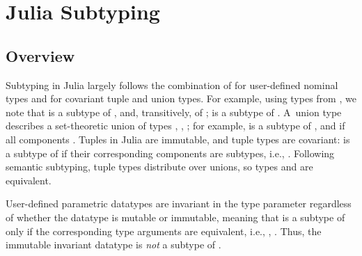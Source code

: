 \chapter{Julia Subtyping}%
\label{chap:julia-sub}


\section{Overview}\label{sec:julia-sub:overview}

Subtyping in Julia largely follows the combination of
 for user-defined nominal types and
 for covariant tuple and union types.
For example, using types from , we note that
 is a subtype of , and, transitively, of ;
 is a subtype of .
A~union type  describes a set-theoretic union of
types , , ; for example,  is a subtype of
, and  if all
components .
Tuples in Julia are immutable, and tuple types are covariant:
 is a subtype of  if
their corresponding components are subtypes, i.e., .
Following semantic subtyping, tuple types distribute over unions,
so types  and
 are equivalent.

User-defined parametric datatypes are invariant in the type parameter
regardless of whether the datatype is
mutable or immutable, meaning that  is a subtype of 
 only if the corresponding type arguments are equivalent,
i.e., , .
Thus, the immutable invariant datatype  is \emph{not}
a subtype of .

